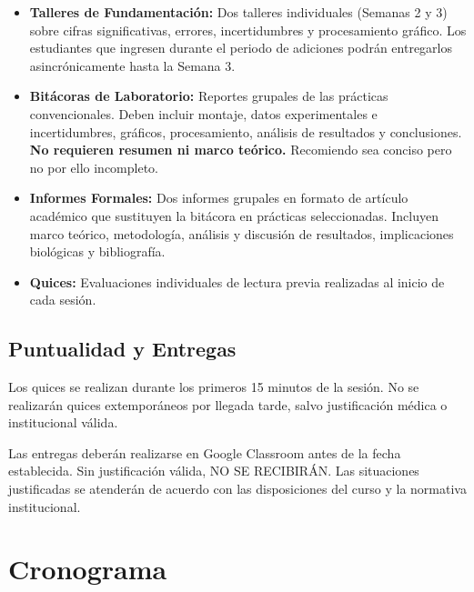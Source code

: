 \documentclass[11pt, letterpaper]{article}
\begin{document}
\begin{itemize}

    \item \textbf{Talleres de Fundamentación:}
    Dos talleres individuales (Semanas 2 y 3) sobre cifras significativas,
    errores, incertidumbres y procesamiento gráfico. Los estudiantes que
    ingresen durante el periodo de adiciones podrán entregarlos
    asincrónicamente hasta la Semana 3.

    \item \textbf{Bitácoras de Laboratorio:}
    Reportes grupales de las prácticas convencionales. Deben incluir
    montaje, datos experimentales e incertidumbres, gráficos,
    procesamiento, análisis de resultados y conclusiones.
    \textbf{No requieren resumen ni marco teórico.} Recomiendo sea conciso pero no por ello incompleto.

    \item \textbf{Informes Formales:}
    Dos informes grupales en formato de artículo académico que
    sustituyen la bitácora en prácticas seleccionadas. Incluyen marco
    teórico, metodología, análisis y discusión de resultados,
    implicaciones biológicas y bibliografía.

    \item \textbf{Quices:}
    Evaluaciones individuales de lectura previa realizadas al inicio de
    cada sesión.

\end{itemize}

\subsection{Puntualidad y Entregas}

Los quices se realizan durante los primeros 15 minutos de la sesión.
No se realizarán quices extemporáneos por llegada tarde, salvo
justificación médica o institucional válida.

Las entregas deberán realizarse en Google Classroom antes de la fecha
establecida. Sin justificación válida, NO SE RECIBIRÁN. Las situaciones justificadas se atenderán de acuerdo con las
disposiciones del curso y la normativa institucional.

\section{Cronograma}
\end{document}
